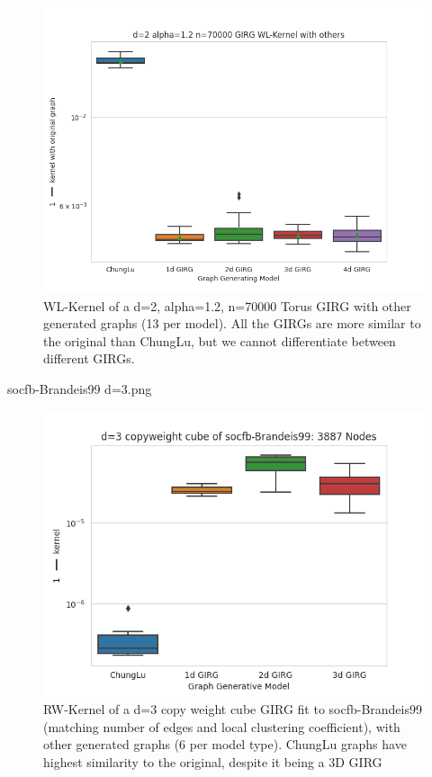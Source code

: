 \begin{figure}
  \centering
\includegraphics[width=0.8\linewidth]{figures/d=2 alpha=1.2 n=70000 GIRG WL-Kernel with others.png}
\caption{WL-Kernel of a d=2, alpha=1.2, n=70000 Torus GIRG with other generated graphs (13 per model). All the GIRGs are more similar to the original than ChungLu, but we cannot differentiate between different GIRGs.}
\label{fig:wl_kernel_gentorus}
\end{figure}

socfb-Brandeis99 d=3.png


\begin{figure}
  \centering
\includegraphics[width=0.8\linewidth]{figures/socfb-Brandeis99 d=3.png}
\caption{RW-Kernel of a d=3 copy weight cube GIRG fit to socfb-Brandeis99 (matching number of edges and local clustering coefficient), with other generated graphs (6 per model type). ChungLu graphs have highest similarity to the original, despite it being a 3D GIRG}
\label{fig:rw_kernel_fitcopycube}
\end{figure}






